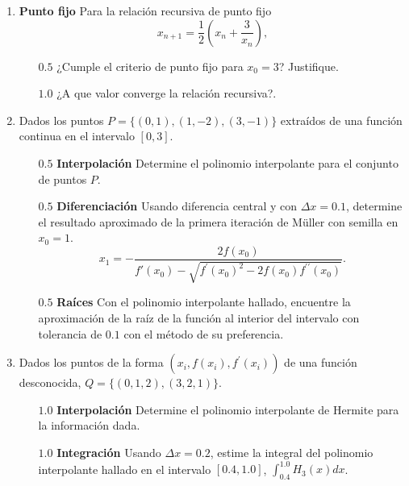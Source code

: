 \documentclass[12pt]{article}
\begin{document}
  \begin{enumerate}[leftmargin=*,widest=9]
    \item \textbf{Punto fijo} Para la relación recursiva de punto fijo \[x_{n+1} = \frac{1}{2} \left(x_n + \frac{3}{x_n} \right),\]
    \begin{itemize}
    \item[$0.5$] ¿Cumple el criterio de punto fijo para $x_0 = 3$? Justifique.
    \vspace{3.5cm}
    \item[$1.0$] ¿A que valor converge la relación recursiva?.
    \vspace{2cm}
    \end{itemize}
 \item Dados los puntos $P=\lbrace (0, 1), (1, {-2}), (3, {-1}) \rbrace$ extraídos de una función continua en el intervalo $\left[0, 3\right]$.
    \begin{itemize}
    \item[$0.5$] \textbf{Interpolación} Determine el polinomio interpolante para el conjunto de puntos $P$.
    \vspace{5cm}
    \item[$0.5$] \textbf{Diferenciación} Usando diferencia central y con $\Delta x = 0.1$, determine el resultado aproximado de la primera iteración de M\"uller con semilla en $x_0=1$.
    \[
    x_1 = -\frac{2f(x_0)}{f\prime(x_0)-\sqrt{f^\prime{(x_0)}^2 - 2f(x_0)f^{\prime\prime}(x_0)}}.
    \]
    \vspace{4cm}
    \item[$0.5$] \textbf{Raíces} Con el polinomio interpolante hallado, encuentre la aproximación de la raíz de la función al interior del intervalo con tolerancia de $0.1$ con el método de su preferencia.
    \vspace{5cm}
    \end{itemize}
    \item Dados los puntos de la forma $(x_i, f(x_i), f^\prime (x_i))$ de una función desconocida, $Q=\lbrace (0, 1, 2), (3, 2, 1) \rbrace$.
    \begin{itemize}
    \item[$1.0$] \textbf{Interpolación} Determine el polinomio interpolante de Hermite para la información dada.
    \vspace{5cm}
    \item[$1.0$] \textbf{Integración} Usando $\Delta x = 0.2$, estime la integral del polinomio interpolante hallado en el intervalo $\left[0.4, 1.0\right]$, $\int_{0.4}^{1.0} H_{3}(x)dx$.
    \end{itemize}
  \end{enumerate}
  \clearpage
\end{document}
